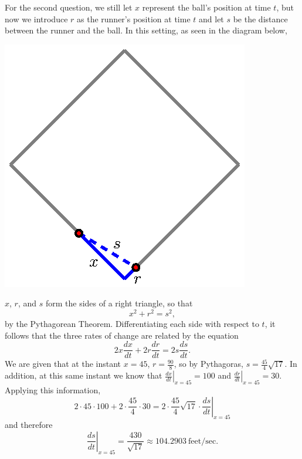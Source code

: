 \begin{activitySolution}
For the second question, we still let $x$ represent the ball's position at time $t$, but now we introduce $r$ as the runner's position at time $t$ and let $s$ be the distance between the runner and the ball.  In this setting, as seen in the diagram below,
\begin{center}
\includegraphics{figures/3_5_Act4Soln2.eps}
\end{center}
$x$, $r$, and $s$ form the sides of a right triangle, so that
$$x^2 + r^2 = s^2,$$
by the Pythagorean Theorem.  Differentiating each side with respect to $t$, it follows that the three rates of change are related by the equation
$$2x \frac{dx}{dt} + 2r \frac{dr}{dt} = 2s \frac{ds}{dt}.$$
We are given that at the instant $x = 45$, $r = \frac{90}{8}$, so by Pythagoras, $s = \frac{45}{4}\sqrt{17}$.  In addition, at this same instant we know that $\left. \frac{dx}{dt} \right|_{x = 45} = 100$ and $\left. \frac{dr}{dt} \right|_{x = 45} = 30$.  Applying this information,
$$2 \cdot 45 \cdot 100 + 2 \cdot \frac{45}{4} \cdot 30 = 2 \cdot \frac{45}{4}\sqrt{17} \cdot \left. \frac{ds}{dt} \right|_{x = 45}$$
and therefore
$$\left. \frac{ds}{dt} \right|_{x = 45} = \frac{430}{\sqrt{17}} \approx 104.2903 \ \mbox{feet/sec}.$$
\end{activitySolution}
\aftera